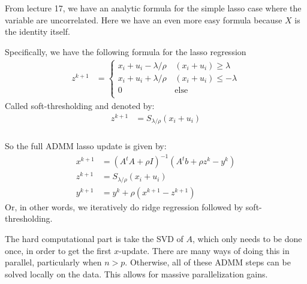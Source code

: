 \begin{frame}[fragile] \frametitle{}

From lecture 17, we have an analytic formula for the simple lasso case
where the variable are uncorrelated. Here we have an even more easy
formula because $X$ is the identity itself.

\pause Specifically, we have the following formula for the lasso regression
\begin{align*}
z^{k+1} &= \left\{ \begin{array}{ll}
x_i + u_i - \lambda / \rho &\, (x_i + u_i) \geq \lambda \\
x_i + u_i + \lambda / \rho &\, (x_i + u_i) \leq -\lambda \\
0 &\, \text{else} \\
\end{array} \right.
\end{align*}
Called soft-thresholding and denoted by:
\begin{align*}
z^{k+1} &= S_{\lambda / \rho} (x_i + u_i)
\end{align*}

\end{frame}

\begin{frame}[fragile] \frametitle{}

So the full ADMM lasso update is given by:
\begin{align*}
x^{k+1} &= (A^t A + \rho I)^{-1}  (A^t b + \rho z^k - y^k) \\
z^{k+1} &= S_{\lambda / \rho} (x_i + u_i) \\
y^{k+1} &= y^k + \rho (x^{k+1} - z^{k+1})
\end{align*}
Or, in other words, we iteratively do ridge regression followed by
soft-thresholding.

\pause The hard computational part is take the SVD of $A$, which only
needs to be done once, in order to get the first $x$-update. There are
many ways of doing this in parallel, particularly when $n > p$. Otherwise,
all of these ADMM steps can be solved locally on the data. This allows
for massive parallelization gains.

\end{frame}

